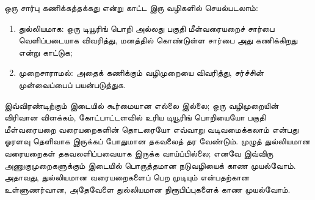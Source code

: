 \documentclass[../../../include/open-logic-section]{subfiles}
\begin{document}
ஒரு சார்பு கணிக்கத்தக்கது என்று காட்ட இரு வழிகளில் செயல்படலாம்:
\begin{enumerate}
\item துல்லியமாக: ஒரு டியூரிங் பொறி அல்லது பகுதி மீள்வரையறைச்
  சார்பை வெளிப்படையாக விவரித்து, மனத்தில் கொண்டுள்ள சார்பை அது
  கணிக்கிறது என்று காட்டுக;
\item முறைசாராமல்: அதைக் கணிக்கும் வழிமுறையை விவரித்து,
  சர்ச்சின் முன்வைப்பைப் பயன்படுத்துக.
\end{enumerate}
இவ்விரண்டிற்கும் இடையில் கூர்மையான எல்லை இல்லை; ஒரு வழிமுறையின்
விரிவான விளக்கம், கோட்பாட்டளவில் உரிய டியூரிங் பொறியையோ பகுதி
மீள்வரையறை வரையறைகளின் தொடரையோ எவ்வாறு வடிவமைக்கலாம் என்பது
ஓரளவு தெளிவாக இருக்கப் போதுமான தகவலைத் தர வேண்டும். முழுத்
துல்லியமான வரையறைகள் தகவலளிப்பவையாக இருக்க வாய்ப்பில்லை; எனவே
இவ்விரு அணுகுமுறைகளுக்கும் இடையில் பொருத்தமான நடுவழியைக் காண
முயல்வோம். அதாவது, துல்லியமான வரையறைகளைப் பெற முடியும் என்பதற்கான
உள்ளுணர்வான, அதேவேளை துல்லியமான நிரூபிப்புகளைக் காண முயல்வோம்.
\end{document}
